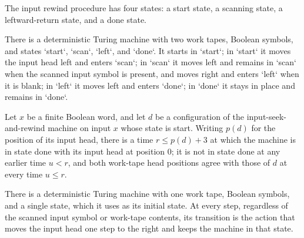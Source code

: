 \begin{definition}
\label{Turing.InputSeekRw}
\leanok
The input rewind procedure has four states: a start state, a scanning state, a
leftward-return state, and a done state.
\end{definition}

\begin{definition}
\label{Turing.inputSeekRewind}
\leanok
{}
There is a deterministic Turing machine with two work tapes, Boolean symbols, and states
`start`, `scan`, `left`, and `done`. It starts in `start`; in `start` it moves the input
head left and enters `scan`; in `scan` it moves left and remains in `scan` when the
scanned input symbol is present, and moves right and enters `left` when it is blank; in
`left` it moves left and enters `done`; in `done` it stays in place and remains in
`done`.
\end{definition}

\begin{theorem}
\label{Turing.inputSeekRewind_run}
\leanok
{}
Let $x$ be a finite Boolean word, and let $d$ be a configuration of the
input-seek-and-rewind machine on input $x$ whose state is start. Writing $p(d)$ for the
position of its input head, there is a time $r\le p(d)+3$ at which the machine is in
state done with its input head at position $0$; it is not in state done at any earlier
time $u<r$, and both work-tape head positions agree with those of $d$ at every time
$u\le r$.
\end{theorem}

\begin{definition}
\label{Turing.inputSeekStep}
\leanok
{}
There is a deterministic Turing machine with one work tape, Boolean symbols, and a
single state, which it uses as its initial state. At every step, regardless of the
scanned input symbol or work-tape contents, its transition is the action that moves the
input head one step to the right and keeps the machine in that state.
\end{definition}

